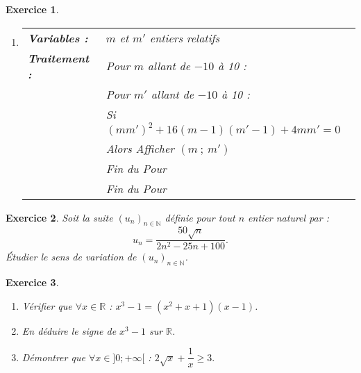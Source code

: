 \documentclass[10pt]{article}
\theoremstyle{exostyle}
\newtheorem{exercice}{Exercice}
\begin{document}
\begin{exercice}
\begin{enumerate}
\begin{center}
              \end{center}
              \vspace{0.25cm}
        \item \begin{center}
                  \begin{tabularx}{0.7\linewidth}{|l|X|}\hline
                      \textbf{Variables :}  & $m$ et $m'$ entiers relatifs                                                  \\
                      \textbf{Traitement :} & Pour $m$ allant de $- 10$ à 10 :                                              \\
                                            & \hspace{0,5cm}Pour $m'$ allant de $-10$ à 10 :                                \\
                                            & \hspace{1cm}Si $\left(mm'\right)^2 + 16(m - 1)\left(m' - 1\right) + 4mm' = 0$ \\
                                            & \hspace{1,5cm}Alors Afficher $\left(m~;~m'\right)$                            \\
                                            & \hspace{0,5cm}Fin du Pour                                                     \\
                                            & Fin du Pour                                                                   \\ \hline
                  \end{tabularx}
              \end{center}

    \end{enumerate}

\end{exercice}

\begin{exercice}
    Soit la suite $(u_n)_{n\in\mathbb{N}}$ définie pour tout $n$ entier naturel par :
    \[
        u_n = \dfrac{50\sqrt{n}}{2n^2-25n+100}.
    \]
    \'Etudier le sens de variation de $(u_n)_{n\in\mathbb{N}}$.
\end{exercice}

\begin{exercice}
    \begin{enumerate}
        \item Vérifier que $\forall x\in\mathbb{R}$ : $x^3-1 = (x^2+x+1)(x-1)$.
        \item En déduire le signe de $x^3-1$ sur $\mathbb{R}$.
        \item Démontrer que  $\forall x\in ]0;+\infty[$ : $2\sqrt{x} + \dfrac{1}{x} \geqslant 3.$
    \end{enumerate}
\end{exercice}
\end{document}
